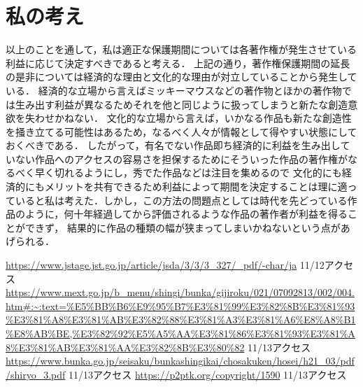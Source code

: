 \documentclass[dvipdfmx]{jarticle}
\begin{document}
\section{私の考え}
以上のことを通して，私は適正な保護期間については各著作権が発生させている利益に応じて決定すべきであると考える．
上記の通り，著作権保護期間の延長の是非については経済的な理由と文化的な理由が対立していることから発生している．
経済的な立場から言えばミッキーマウスなどの著作物とほかの著作物では生み出す利益が異なるためそれを他と同じように扱ってしまうと新たな創造意欲を失わせかねない．
文化的な立場から言えば，いかなる作品も新たな創造性を掻き立てる可能性はあるため，なるべく人々が情報として得やすい状態にしておくべきである．
したがって，有名でない作品即ち経済的に利益を生み出していない作品へのアクセスの容易さを担保するためにそういった作品の著作権がなるべく早く切れるようにし，秀でた作品などは注目を集めるので
文化的にも経済的にもメリットを共有できるため利益によって期間を決定することは理に適っていると私は考えた．しかし，この方法の問題点としては時代を先どっている作品のように，何十年経過してから評価されるような作品の著作者が利益を得ることができず，
結果的に作品の種類の幅が狭まってしまいかねないという点があげられる．
\begin{thebibliography}{99}
     \url{https://www.jstage.jst.go.jp/article/jsda/3/3/3_327/_pdf/-char/ja} 11/12アクセス
     \url{https://www.mext.go.jp/b_menu/shingi/bunka/gijiroku/021/07092813/002/004.htm#:~:text=%E5%BB%B6%E9%95%B7%E3%81%99%E3%82%8B%E3%81%93%E3%81%A8%E3%81%AB%E3%82%88%E3%81%A3%E3%81%A6%E8%A8%B1%E8%AB%BE,%E3%82%92%E5%A5%AA%E3%81%86%E3%81%93%E3%81%A8%E3%81%AB%E3%81%AA%E3%82%8B%E3%80%82} 11/13アクセス
     \url{https://www.bunka.go.jp/seisaku/bunkashingikai/chosakuken/hosei/h21_03/pdf/shiryo_3.pdf} 11/13アクセス
     \url{https://p2ptk.org/copyright/1590} 11/13アクセス
\end{thebibliography}
\end{document}
